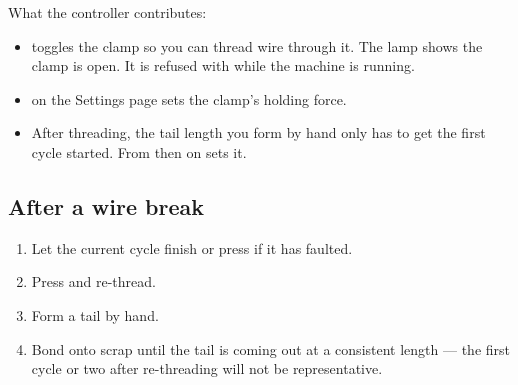 
What the controller contributes:

\begin{itemize}[leftmargin=*]
\item {} toggles the clamp so you can thread wire through it.
  The  lamp shows the clamp is open. It is refused with
   while the machine is running.
\item {} on the Settings page sets the clamp's holding
  force.
\item After threading, the tail length you form by hand only has to get the
  first cycle started. From then on  sets it.
\end{itemize}

\subsection*{After a wire break}

\begin{enumerate}[leftmargin=*]
\item Let the current cycle finish or press  if it has faulted.
\item Press  and re-thread.
\item Form a tail by hand.
\item Bond onto scrap until the tail is coming out at a consistent length ---
  the first cycle or two after re-threading will not be representative.
\end{enumerate}
